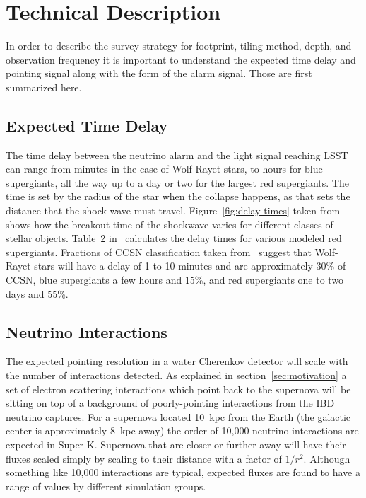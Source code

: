 \documentclass[12pt, letterpaper]{article}
\newcommand{\superk}  {Super\nobreakdash-K\xspace}
\begin{document}
\clearpage

\newpage
\section{Technical Description}

In order to describe the survey strategy for footprint, tiling method,
depth, and observation frequency it is important to understand the
expected time delay and pointing signal along with the form of the alarm
signal.  Those are first summarized here.

\subsection{Expected Time Delay}

The time delay between the neutrino alarm and the light signal
reaching LSST can range from minutes in the case of Wolf-Rayet stars,
to hours for blue supergiants, all the way up to a day or two for the
largest red supergiants.  The time is set by the radius of the star
when the collapse happens, as that sets the distance that the shock
wave must travel.  Figure~\ref{fig:delay-times} taken
from~\cite{2013ApJ...778...81K} shows how the breakout time of the
shockwave varies for different classes of stellar objects. Table~2
in~\cite{2015ApJ...814...63M} calculates the delay times for various
modeled red supergiants.  Fractions of CCSN classification taken
from~\cite{2017PASP..129e4201S} suggest that Wolf-Rayet stars will have
a delay of 1 to 10 minutes and are approximately 30\% of CCSN, blue
supergiants a few hours and 15\%, and red supergiants one to two days 
and 55\%.

\subsection{Neutrino Interactions}
\label{sec:interactions}

The expected pointing resolution in a water Cherenkov detector will
scale with the number of interactions detected.  As explained in
section~\ref{sec:motivation} a set of electron scattering interactions
which point back to the supernova will be sitting on top of a
background of poorly-pointing interactions from the IBD neutrino
captures. For a supernova located 10~kpc from the Earth (the galactic
center is approximately 8~kpc away) the order of 10,000 neutrino
interactions are expected in \superk.  Supernova that are closer or
further away will have their fluxes scaled simply by scaling to their
distance with a factor of $1/r^2$.  Although something like 10,000
interactions are typical, expected fluxes are found to have a range of
values by different simulation groups.
\end{document}
